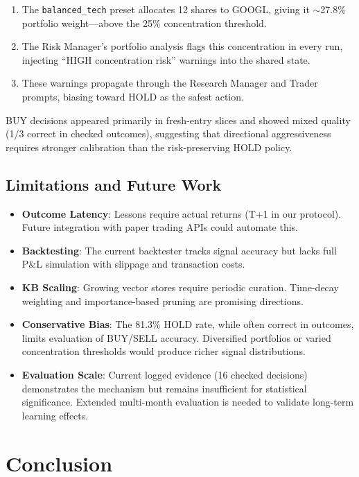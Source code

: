 \documentclass[conference]{IEEEtran}
\begin{document}
\begin{enumerate}
\item The \texttt{balanced\_tech} preset allocates 12 shares to GOOGL, giving it $\sim$27.8\% portfolio weight---above the 25\% concentration threshold.
\item The Risk Manager's portfolio analysis flags this concentration in every run, injecting ``HIGH concentration risk'' warnings into the shared state.
\item These warnings propagate through the Research Manager and Trader prompts, biasing toward HOLD as the safest action.
\end{enumerate}

BUY decisions appeared primarily in fresh-entry slices and showed mixed quality (1/3 correct in checked outcomes), suggesting that directional aggressiveness requires stronger calibration than the risk-preserving HOLD policy.

\subsection{Limitations and Future Work}

\begin{itemize}
\item \textbf{Outcome Latency}: Lessons require actual returns (T+1 in our protocol). Future integration with paper trading APIs could automate this.
\item \textbf{Backtesting}: The current backtester tracks signal accuracy but lacks full P\&L simulation with slippage and transaction costs.
\item \textbf{KB Scaling}: Growing vector stores require periodic curation. Time-decay weighting and importance-based pruning are promising directions.
\item \textbf{Conservative Bias}: The 81.3\% HOLD rate, while often correct in outcomes, limits evaluation of BUY/SELL accuracy. Diversified portfolios or varied concentration thresholds would produce richer signal distributions.
\item \textbf{Evaluation Scale}: Current logged evidence (16 checked decisions) demonstrates the mechanism but remains insufficient for statistical significance. Extended multi-month evaluation is needed to validate long-term learning effects.
\end{itemize}

\section{Conclusion}
\end{document}
